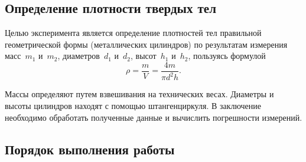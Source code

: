 \documentclass[a4paper, 12pt]{extarticle}
\begin{document}
\subsection{Определение плотности твердых тел}

Целью эксперимента является определение плотностей тел правильной геометрической формы (металлических цилиндров) по результатам измерения масс~$m_1$ и~$m_2$, диаметров~$d_1$ и~$d_2$, высот~$h_1$ и~$h_2$, пользуясь формулой
\begin{equation}
\label{fig:mzero-density}
\rho = \frac{m}{V} = \frac{4m}{\pi d^2 h}.
\end{equation}

Массы определяют путем взвешивания на технических весах. Диаметры и высоты цилиндров находят с помощью штангенциркуля. В заключение необходимо обработать полученные данные и вычислить погрешности измерений.

\subsection{Порядок выполнения работы}
\end{document}
